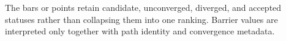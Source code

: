 The bars or points retain candidate, unconverged, diverged, and accepted statuses rather than collapsing them into one ranking. Barrier values are interpreted only together with path identity and convergence metadata.
